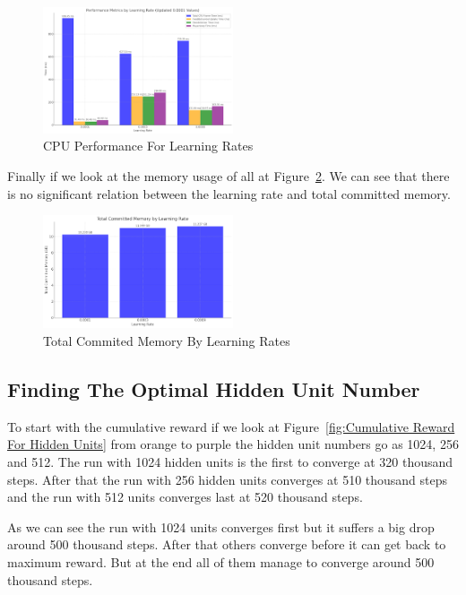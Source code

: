 \documentclass{LSkill}
\begin{document}
\begin{figure}[htbp]
    \centering
    \includegraphics[width=0.5\textwidth]{figure 5.png} 
    \caption{CPU Performance For Learning Rates}
    \label{fig:CPU Performance For Learning Rates}
\end{figure}
\vspace{0.5cm}
Finally if we look at the memory usage of all at Figure~\ref{fig:Total Commited Memory By Learning Rates}. We can see that there is no significant relation between the learning rate and total committed memory.

\begin{figure}[htbp]
    \centering
    \includegraphics[width=0.5\textwidth]{figure 6.png} 
    \caption{Total Commited Memory By Learning Rates}
    \label{fig:Total Commited Memory By Learning Rates}
\end{figure}

\subsection{Finding The Optimal Hidden Unit Number}
To start with the cumulative reward if we look at Figure~\ref{fig:Cumulative Reward For Hidden Units} from orange to purple the hidden unit numbers go as 1024, 256 and 512. The run with 1024 hidden units is the first to converge at 320 thousand steps. After that the run with 256 hidden units converges at 510 thousand steps and the run with 512 units converges last at 520 thousand steps.

As we can see the run with 1024 units converges first but it suffers a big drop around 500 thousand steps. After that others converge before it can get back to maximum reward. But at the end all of them manage to converge around 500 thousand steps.
\end{document}
